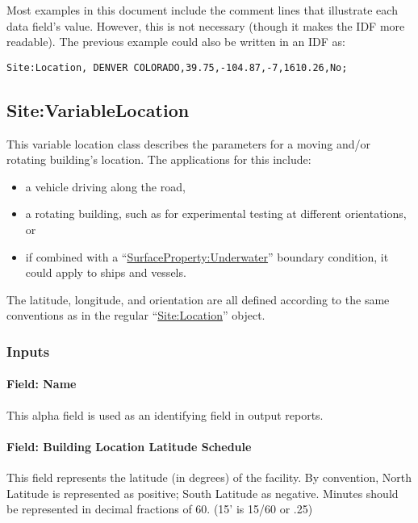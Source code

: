 Most examples in this document include the comment lines that illustrate each data field's value. However, this is not necessary (though it makes the IDF more readable). The previous example could also be written in an IDF as:

\begin{lstlisting}
Site:Location, DENVER COLORADO,39.75,-104.87,-7,1610.26,No;
\end{lstlisting}


\subsection{Site:VariableLocation}\label{sitevariablelocation}

This variable location class describes the parameters for a moving and/or rotating building's location.
The applications for this include:

\begin{itemize}
 \item a vehicle driving along the road,
 \item a rotating building, such as for experimental testing at different orientations, or
 \item if combined with a ``\hyperref[surfacepropertyunderwater]{SurfaceProperty:Underwater}'' boundary condition, it could apply to ships and vessels.
\end{itemize}

The latitude, longitude, and orientation are all defined according to the same conventions as in the regular ``\hyperref[sitelocation]{Site:Location}'' object.

\subsubsection{Inputs}\label{inputs-026}

\paragraph{Field: Name}\label{field-name-025}

This alpha field is used as an identifying field in output reports.

\paragraph{Field: Building Location Latitude Schedule}\label{field-building-location-latitude-schedule}

This field represents the latitude (in degrees) of the facility. By convention, North Latitude is represented as positive; South Latitude as negative. Minutes should be represented in decimal fractions of 60. (15' is 15/60 or .25)

